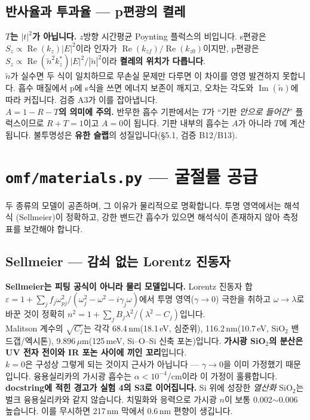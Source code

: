 \documentclass[10pt,a4paper]{article}
\newcommand{\note}[1]{%
  \begin{tcolorbox}[enhanced,breakable,colback=white,colframe=accent,
    boxrule=0pt,leftrule=1.6pt,arc=0pt,outer arc=0pt,
    left=6pt,right=2pt,top=3pt,bottom=3pt,boxsep=0pt,
    before skip=5pt, after skip=8pt]
  #1
  \end{tcolorbox}}
\newcommand{\nt}{\tilde n}
\newcommand{\Imag}{\operatorname{Im}}
\newcommand{\Real}{\operatorname{Re}}
\begin{document}
\subsection{반사율과 투과율 — p편광의 켤레}

\note{
\textbf{$T$는 $|t|^2$가 아닙니다.} $z$방향 시간평균 Poynting 플럭스의 비입니다.
s편광은 $S_z\propto\Real(k_z)|E|^2$이라 인자가 $\Real(k_{zf})/\Real(k_{z0})$이지만,
p편광은 $S_z\propto\Real(\nt^2k_z^*)|E|^2/|\nt|^2$이라 \textbf{켤레의 위치가 다릅니다}.\\[4pt]
$\nt$가 실수면 두 식이 일치하므로 무손실 문제만 다루면 이 차이를 영영 발견하지 못합니다.
흡수 매질에서 p에 s식을 쓰면 에너지 보존이 깨지고, 오차는 각도와 $\Imag(\nt)$에 따라 커집니다.
검증 A3가 이를 잡아냅니다.\\[4pt]
\textbf{$A = 1-R-T$의 의미에 주의.} 반무한 흡수 기판에서는 $T$가 ``기판 \emph{안으로 들어간}''
플럭스이므로 $R+T=1$이고 $A=0$이 됩니다. 기판 내부의 흡수는 $A$가 아니라 $T$에 계산됩니다.
불투명성은 \textbf{유한 슬랩}의 성질입니다(§5.1, 검증 B12/B13).
}

\section{\texttt{omf/materials.py} — 굴절률 공급}

두 종류의 모델이 공존하며, 그 이유가 물리적으로 명확합니다. 투명 영역에서는 해석식
(Sellmeier)이 정확하고, 강한 밴드간 흡수가 있으면 해석식이 존재하지 않아 측정 표를
보간해야 합니다.

\subsection{Sellmeier — 감쇠 없는 Lorentz 진동자}

\note{
\textbf{Sellmeier는 피팅 공식이 아니라 물리 모델입니다.} Lorentz 진동자 합
$\varepsilon=1+\sum_j f_j\omega_{pj}^2/(\omega_j^2-\omega^2-i\gamma_j\omega)$에서
투명 영역($\gamma\to0$) 극한을 취하고 $\omega\to\lambda$로 바꾼 것이 정확히
$n^2=1+\sum_j B_j\lambda^2/(\lambda^2-C_j)$입니다.\\[4pt]
Malitson 계수의 $\sqrt{C_j}$는 각각 68.4\,nm(18.1\,eV, 심준위), 116.2\,nm(10.7\,eV,
SiO$_2$ 밴드갭/엑시톤), 9.896\,$\mu$m(125\,meV, Si--O--Si 신축 포논)입니다.
\textbf{가시광 SiO$_2$의 분산은 UV 전자 전이와 IR 포논 사이에 끼인 꼬리}입니다.\\[4pt]
$k=0$은 구성상 그렇게 되는 것이지 근사가 아닙니다 — $\gamma\to0$을 이미 가정했기 때문입니다.
융용실리카의 가시광 흡수는 $\alpha<10^{-4}$/cm이라 이 가정이 훌륭합니다.\\[4pt]
\textbf{docstring에 적힌 경고가 실험 4의 S3로 이어집니다.} Si 위에 성장한 \emph{열산화}
SiO$_2$는 벌크 융용실리카와 같지 않습니다. 치밀화와 응력으로 가시광 $n$이 보통
0.002$\sim$0.006 높습니다. 이를 무시하면 217\,nm 막에서 0.6\,nm 편향이 생깁니다.
}
\end{document}
